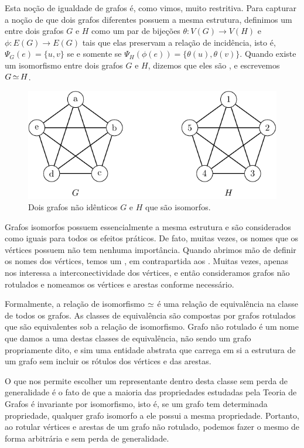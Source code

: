 Esta noção de igualdade de grafos é, como vimos, muito restritiva. Para capturar a noção de que dois grafos diferentes possuem a mesma estrutura, definimos um  entre dois grafos $G$ e $H$ como um par de bijeções $\theta : V(G) \to V(H)$ e $\phi : E(G) \to E(G)$ tais que elas preservam a relação de incidência, isto é, $\Psi_G(e) = \{u,v\}$ se e somente se $\Psi_H(\phi(e)) = \{\theta(u),\theta(v)\}$. Quando existe um isomorfismo entre dois grafos $G$ e $H$, dizemos que eles são , e escrevemos $G \operatorname{\simeq} H$.

\begin{figure}[ht!]
\centering
\includegraphics{figures/1_intro_2_iso}
\caption{Dois grafos não idênticos $G$ e $H$ que são isomorfos.}
\label{fig:intro:iso}
\end{figure}

Grafos isomorfos possuem essencialmente a mesma estrutura e são considerados como iguais para todos os efeitos práticos. De fato, muitas vezes, os nomes que os vértices possuem não tem nenhuma importância. Quando abrimos mão de definir os nomes dos vértices, temos um , em contrapartida aos . Muitas vezes, apenas nos interessa a interconectividade dos vértices, e então consideramos grafos não rotulados e nomeamos os vértices e arestas conforme necessário.

Formalmente, a relação de isomorfismo $\operatorname{\simeq}$ é uma relação de equivalência na classe de todos os grafos. As classes de equivalência são compostas por grafos rotulados que são equivalentes sob a relação de isomorfismo. Grafo não rotulado é um nome que damos a uma destas classes de equivalência, não sendo um grafo propriamente dito, e sim uma entidade abstrata que carrega em si a estrutura de um grafo sem incluir os rótulos dos vértices e das arestas.

O que nos permite escolher um representante dentro desta classe sem perda de generalidade é o fato de que a maioria das propriedades estudadas pela Teoria de Grafos é invariante por isomorfismo, isto é, se um grafo tem determinada propriedade, qualquer grafo isomorfo a ele possui a mesma propriedade. Portanto, ao rotular vértices e arestas de um grafo não rotulado, podemos fazer o mesmo de forma arbitrária e sem perda de generalidade.

